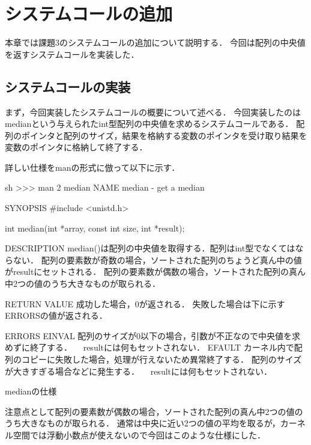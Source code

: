 \chapter{システムコールの追加}
本章では課題3のシステムコールの追加について説明する．
今回は配列の中央値を返すシステムコールを実装した．

\section{システムコールの実装}
まず，今回実装したシステムコールの概要について述べる．
今回実装したのはmedianという与えられたint型配列の中央値を求めるシステムコールである．
配列のポインタと配列のサイズ，結果を格納する変数のポインタを受け取り結果を変数のポインタに格納して終了する．

詳しい仕様をmanの形式に倣って以下に示す．
\begin{longlisting}
\begin{myminted}{sh}{}
>>> man 2 median
NAME
       median - get a median

SYNOPSIS
       #include <unistd.h>

       int median(int *array, const int size, int *result);

DESCRIPTION
       median()は配列の中央値を取得する．配列はint型でなくてはならない．
       配列の要素数が奇数の場合，ソートされた配列のちょうど真ん中の値がresultにセットされる．
       配列の要素数が偶数の場合，ソートされた配列の真ん中2つの値のうち大きなものが取られる．

RETURN VALUE
       成功した場合，0が返される．
       失敗した場合は下に示すERRORSの値が返される．

ERRORS
       EINVAL 配列のサイズが0以下の場合，引数が不正なので中央値を求めずに終了する．
            　resultには何もセットされない．
       EFAULT カーネル内で配列のコピーに失敗した場合，処理が行えないため異常終了する．
              配列のサイズが大きすぎる場合などに発生する．
            　resultには何もセットされない．
\end{myminted}
\caption{medianの仕様}
\label{lst:syscallspec}
\end{longlisting}

注意点として配列の要素数が偶数の場合，ソートされた配列の真ん中2つの値のうち大きなものが取られる．
通常は中央に近い2つの値の平均を取るが，カーネル空間では浮動小数点が使えないので今回はこのような仕様にした．

